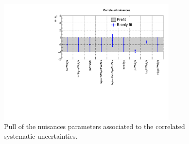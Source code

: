 \begin{figure}[tbhp]
    \caption{ Pull of the nuisances parameters associated to the correlated systematic uncertainties. 
      \label{fig:nuisPull_Correlated}}
  \begin{center}
    \includegraphics[width=0.8\textwidth]{figures/postFitResults/nuisancePlots/Correlated_nuisances}
  \end{center}
\end{figure}

\clearpage


